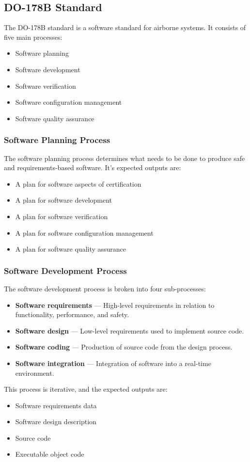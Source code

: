 \documentclass{article}
\begin{document}
\subsection{DO-178B Standard}
The DO-178B standard is a software standard for airborne systems. It
consists of five main processes:
\begin{itemize}
    \item Software planning
    \item Software development
    \item Software verification
    \item Software configuration management
    \item Software quality assurance
\end{itemize}
\subsubsection{Software Planning Process}
The software planning process determines what needs to be done to
produce safe and requirements-based software. It's expected outputs
are:
\begin{itemize}
    \item A plan for software aspects of certification
    \item A plan for software development
    \item A plan for software verification
    \item A plan for software configuration management
    \item A plan for software quality assurance
\end{itemize}
\subsubsection{Software Development Process}
The software development process is broken into four sub-processes:
\begin{itemize}
    \item \textbf{Software requirements} --- High-level requirements in
          relation to functionality, performance, and safety.
    \item \textbf{Software design} --- Low-level requirements used
          to implement source code.
    \item \textbf{Software coding} --- Production of source code from
          the design process.
    \item \textbf{Software integration} --- Integration of software
          into a real-time environment.
\end{itemize}
This process is iterative, and the expected outputs are:
\begin{itemize}
    \item Software requirements data
    \item Software design description
    \item Source code
    \item Executable object code
\end{itemize}
\end{document}
